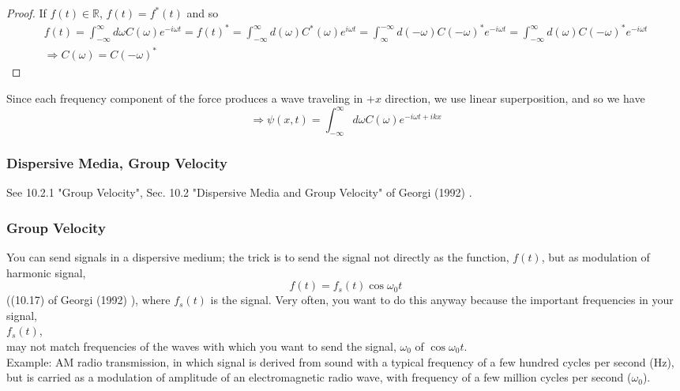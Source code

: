 \documentclass[10pt]{amsart}
\begin{document}
\begin{multicols*}{2}
\begin{proof}
If $f(t) \in \mathbb{R}$, $f(t) = f^*(t)$ and so
\[
\begin{gathered}
	f(t) = \int_{-\infty}^{\infty} d\omega C(\omega) e^{-i\omega t} = f(t)^* = \int_{-\infty}^{\infty} d(\omega) C^*(\omega) e^{i\omega t} = \int_{\infty}^{-\infty} d(-\omega) C(-\omega)^* e^{-i\omega t} = \int_{-\infty}^{\infty} d(\omega) C(-\omega)^* e^{-i\omega t} \\
	\Longrightarrow C(\omega) = C(-\omega)^*
\end{gathered}
\]
\end{proof}

Since each frequency component of the force produces a wave traveling in $+x$ direction, we use linear superposition, and so we have
\[
\Longrightarrow \psi(x,t) = \int_{-\infty}^{\infty} d\omega C(\omega) e^{-i\omega t + ikx}
\]

\subsubsection{Dispersive Media, Group Velocity}

See 10.2.1 "Group Velocity", Sec. 10.2 "Dispersive Media and Group Velocity" of Georgi (1992) \cite{Geor1992}.

\subsubsection{Group Velocity}

You can send signals in a dispersive medium; the trick is to send the signal not directly as the function, $f(t)$, but as modulation of harmonic signal,
\begin{equation}
	f(t) = f_s(t) \cos{\omega_0 t}
\end{equation}
((10.17) of Georgi (1992) \cite{Geor1992}), where $f_s(t)$ is the signal. Very often, you want to do this anyway because the important frequencies in your signal, \\
$f_s(t)$, \\
may not match frequencies of the waves with which you want to send the signal, $\omega_0$ of $\cos{\omega_0 t}$. \\

Example: AM radio transmission, in which signal is derived from sound with a typical frequency of a few hundred cycles per second (Hz), but is carried as a modulation of amplitude of an electromagnetic radio wave, with frequency of a few million cycles per second ($\omega_0$).


\end{multicols*}
\end{document}
